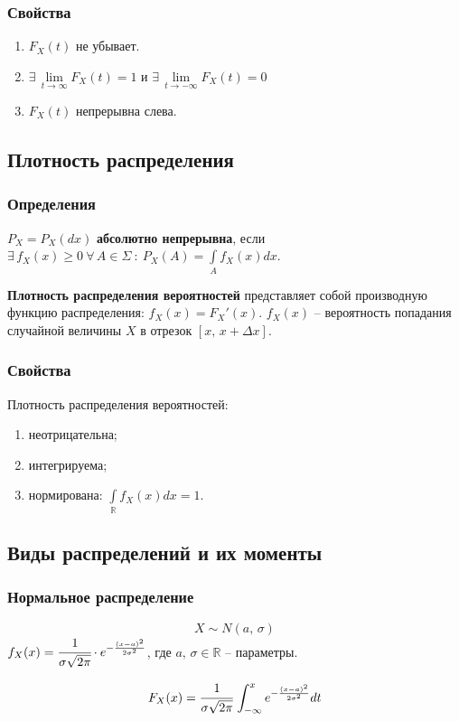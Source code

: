 \documentclass{article}
\newcommand{\R}{\mathbb{R}}
\begin{document}
\subsubsection{Свойства}
\begin{enumerate}
    \item $F_X(t)$ не убывает.
    \item $ \exists\,\lim\limits_{t\to\infty}F_X(t)=1 $ и $\exists\,\lim\limits_{t\to-\infty}F_X(t)=0$
    \item $F_X(t)$ непрерывна слева.
\end{enumerate}
\subsection{Плотность распределения}
\subsubsection{Определения}
$P_X=P_X(dx)$ \textbf{абсолютно непрерывна}, если $\exists\,f_X(x)\geq 0\:\forall\,A\in\Sigma\::\:P_X(A)=\int\limits_A f_X(x)dx$.

\textbf{Плотность распределения вероятностей} представляет собой производную функцию распределения: $f_X(x)=F_X'(x)$. $f_X(x)$ -- вероятность попадания случайной величины $X$ в отрезок $[x,\,x+\Delta x]$.

\subsubsection{Свойства}
Плотность распределения вероятностей:
\begin{enumerate}
    \item неотрицательна;
    \item интегрируема;
    \item нормирована: $\int\limits_{\R}f_X(x)dx=1$.
\end{enumerate}
\subsection{Виды распределений и их моменты}
\subsubsection{Нормальное распределение}
$$X \sim N(a,\,\sigma)$$
$ f_X(x)=\cfrac{1}{\sigma\sqrt{2\pi}}\cdot e^{-\frac{(x-a)^2}{2\sigma^2}} $, где $a,\,\sigma\in\R$ -- параметры.

$$F_X(x)=\cfrac{1}{\sigma\sqrt{2\pi}}\,\int_{-\infty}^x e^{-\frac{(x-a)^2}{2\sigma^2}}dt$$
\end{document}
